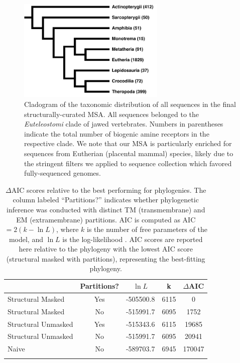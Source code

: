 \documentclass[fleqn,10pt]{wlpeerj}
\begin{document}
\newpage


\begin{figure}[htbp]
	\centerline{\includegraphics[width=7cm]{figures/taxonomic_distribution.pdf}}
	\caption{\label{taxa_dist} Cladogram of the taxonomic distribution of all sequences in the final structurally-curated MSA. All sequences belonged to the \emph{Euteleostomi} clade of jawed vertebrates. Numbers in parentheses indicate the total number of biogenic amine receptors in the respective clade. We note that our MSA is particularly enriched for sequences from Eutherian (placental mammal) species, likely due to the stringent filters we applied to sequence collection which favored fully-sequenced genomes.}
\end{figure}

\vspace{3cm}

\begin{table}[htbp]
	\centering
	\begin{tabular}{l c l l c}
		\hline\noalign{\smallskip}
		\multicolumn{1}{c}{MSA} & \multicolumn{1}{c}{Partitions?} & \multicolumn{1}{c}{$\ln L$} & \multicolumn{1}{c}{k} & \multicolumn{1}{l}{$\Delta$AIC} \\
		\hline\noalign{\smallskip}
		Structural Masked & Yes & -505500.8 & 6115 & 0 \\
		Structural Masked & No & -515991.7 & 6095 & 1752 \\  
		Structural Unmasked & Yes & -515343.6 & 6115 & 19685 \\
		Structural Unmasked & No & -515991.7 & 6095 & 20941 \\ 
		Naive & No &  -589703.7 & 6945 & 170047 \\
		\noalign{\smallskip}\hline\noalign{\smallskip} 
	\end{tabular}
	\caption{\label{tab:phylo_AIC} $\Delta$AIC scores relative to the best performing for phylogenies. The column labeled ``Partitions?'' indicates whether phylogenetic inference was conducted with distinct TM (transmembrane) and EM (extramembrane) partitions. AIC is computed as AIC $= 2(k - \ln L)$, where $k$ is the number of free parameters of the model, and $\ln L$ is the log-likelihood \citep{Akaike1974,BurnhamAnderson2004}. AIC scores are reported here relative to the phylogeny with the lowest AIC score (structural masked with partitions), representing the best-fitting phylogeny.}
\end{table}
\end{document}
